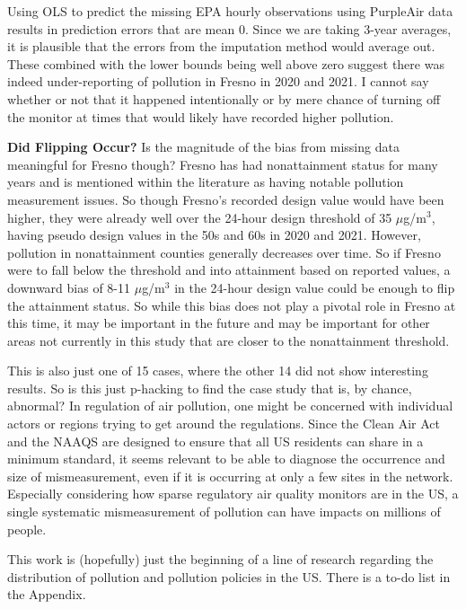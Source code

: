\documentclass[12pt]{article}
\begin{document}
Using OLS to predict the missing EPA hourly observations using PurpleAir data results in prediction errors that are mean 0. Since we are taking 3-year averages, it is plausible that the errors from the imputation method would average out. These combined with the lower bounds being well above zero suggest there was indeed under-reporting of pollution in Fresno in 2020 and 2021. I cannot say whether or not that it happened intentionally or by mere chance of turning off the monitor at times that would likely have recorded higher pollution.


\noindent\textbf{Did Flipping Occur?}
Is the magnitude of the bias from missing data meaningful for Fresno though? Fresno has had nonattainment status for many years and is mentioned within the literature as having notable pollution measurement issues. So though Fresno's recorded design value would have been higher, they were already well over the 24-hour design threshold of 35 $\mu$g/m$^3$, having pseudo design values in the 50s and 60s in 2020 and 2021. However, pollution in nonattainment counties generally decreases over time. So if Fresno were to fall below the threshold and into attainment based on reported values, a downward bias of 8-11 $\mu$g/m$^3$ in the 24-hour design value could be enough to flip the attainment status. So while this bias does not play a pivotal role in Fresno at this time, it may be important in the future and may be important for other areas not currently in this study that are closer to the nonattainment threshold.

This is also just one of 15 cases, where the other 14 did not show interesting results. So is this just p-hacking to find the case study that is, by chance, abnormal? In regulation of air pollution, one might be concerned with individual actors or regions trying to get around the regulations. Since the Clean Air Act and the NAAQS are designed to ensure that all US residents can share in a minimum standard, it seems relevant to be able to diagnose the occurrence and size of mismeasurement, even if it is occurring at only a few sites in the network. Especially considering how sparse regulatory air quality monitors are in the US, a single systematic mismeasurement of pollution can have impacts on millions of people.

This work is (hopefully) just the beginning of a line of research regarding the distribution of pollution and pollution policies in the US. There is a to-do list in the Appendix.
\end{document}
